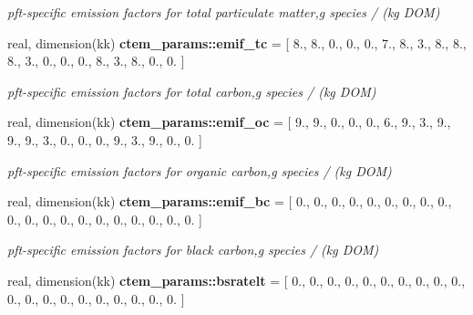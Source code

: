 \begin{DoxyCompactItemize}
\begin{DoxyCompactList}\small\item\em pft-\/specific emission factors for total particulate matter,g species / (kg D\+O\+M) \end{DoxyCompactList}\item 
\hypertarget{namespacectem__params_a3c3f54dc0014275a3c519f419392bfc9}{}real, dimension(kk) {\bfseries ctem\+\_\+params\+::emif\+\_\+tc} = \mbox{[} 8., 8., 0., 0., 0., 7., 8., 3., 8., 8., 8., 3., 0., 0., 0., 8., 3., 8., 0., 0. \mbox{]}\label{namespacectem__params_a3c3f54dc0014275a3c519f419392bfc9}

\begin{DoxyCompactList}\small\item\em pft-\/specific emission factors for total carbon,g species / (kg D\+O\+M) \end{DoxyCompactList}\item 
\hypertarget{namespacectem__params_a430c392f52f3c3c0be45b52919c33da9}{}real, dimension(kk) {\bfseries ctem\+\_\+params\+::emif\+\_\+oc} = \mbox{[} 9., 9., 0., 0., 0., 6., 9., 3., 9., 9., 9., 3., 0., 0., 0., 9., 3., 9., 0., 0. \mbox{]}\label{namespacectem__params_a430c392f52f3c3c0be45b52919c33da9}

\begin{DoxyCompactList}\small\item\em pft-\/specific emission factors for organic carbon,g species / (kg D\+O\+M) \end{DoxyCompactList}\item 
\hypertarget{namespacectem__params_a4cee3e6d838d5971990e283211e601e6}{}real, dimension(kk) {\bfseries ctem\+\_\+params\+::emif\+\_\+bc} = \mbox{[} 0., 0., 0., 0., 0., 0., 0., 0., 0., 0., 0., 0., 0., 0., 0., 0., 0., 0., 0., 0. \mbox{]}\label{namespacectem__params_a4cee3e6d838d5971990e283211e601e6}

\begin{DoxyCompactList}\small\item\em pft-\/specific emission factors for black carbon,g species / (kg D\+O\+M) \end{DoxyCompactList}\item 
\hypertarget{namespacectem__params_a9ba355c48c189d4bbe0db06896779c1f}{}real, dimension(kk) {\bfseries ctem\+\_\+params\+::bsratelt} = \mbox{[} 0., 0., 0., 0., 0., 0., 0., 0., 0., 0., 0., 0., 0., 0., 0., 0., 0., 0., 0., 0. \mbox{]}\label{namespacectem__params_a9ba355c48c189d4bbe0db06896779c1f}


\end{DoxyCompactItemize}
